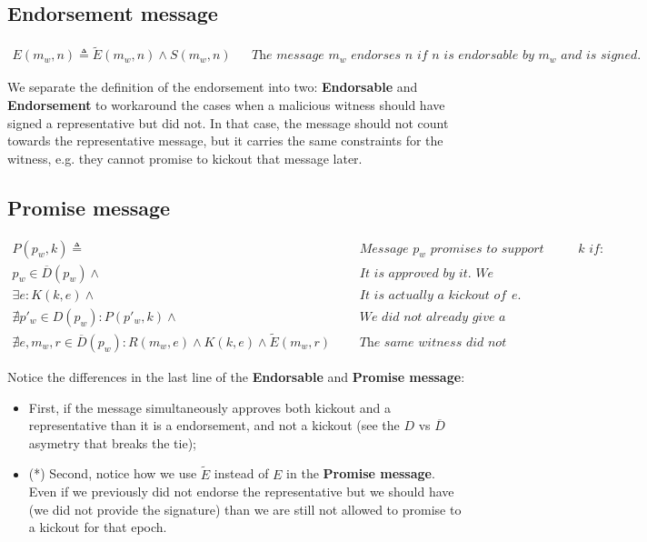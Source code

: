 \documentclass{article}
\begin{document}
    \subsection*{Endorsement message}
    \[
        \begin{aligned}
            E(m_w, n)  \triangleq \widetilde{E}(m_w, n) \land S(m_w, n) && \textit{The message $m_w$ endorses $n$ if $n$ is endorsable by $m_w$ and is signed.}
        \end{aligned}
    \]

    We separate the definition of the endorsement into two: \textbf{Endorsable} and \textbf{Endorsement} to workaround the cases when a malicious witness should have signed a representative but did not. In that case, the message should not count towards the representative message, but it carries the same constraints for the witness, e.g. they cannot promise to kickout that message later.

    \subsection*{Promise message}
    \[
        \begin{aligned}
            P(p_w, k)  \triangleq & \text{   } & \textit{Message $p_w$ promises to support kickout $k$ if:} \\
            p_w\in \overline{D}(p_w) \land & & \textit{It is approved by it. We allow kickout message to promise to itself.} \\
            \exists e: K(k, e) \land & & \textit{It is actually a kickout of some epoch $e$.} \\
            \nexists p'_w\in D(p_w): P(p'_w, k)\land & & \textit{We did not already give a promise with some other message.} \\
            \nexists e, m_w, r\in \overline{D}(p_w): R(m_w, e)\land K(k, e) \land \widetilde{E}(m_w, r) && \textit{The same witness did not already produce and endorsement(*) for the very same epoch.}
        \end{aligned}
    \]

    Notice the differences in the last line of the \textbf{Endorsable} and \textbf{Promise message}:
    \begin{itemize}
        \item First, if the message simultaneously approves both kickout and a representative than it is a endorsement, and not a kickout (see the $D$ vs $\overline{D}$ asymetry that breaks the tie);
        \item (*) Second, notice how we use $\widetilde{E}$ instead of $E$ in the \textbf{Promise message}. Even if we previously did not endorse the representative but we should have (we did not provide the signature) than we are still not allowed to promise to a kickout for that epoch.
    \end{itemize}
\end{document}
